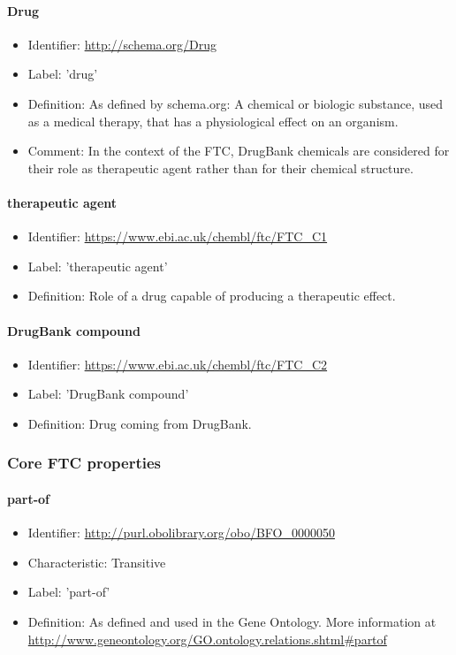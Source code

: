 \paragraph{Drug}
\begin{itemize}
  \item Identifier: \url{http://schema.org/Drug}
  \item Label: 'drug'
  \item Definition: As defined by schema.org: A chemical or biologic substance, used as a medical therapy, that has a physiological effect on an organism.
  \item Comment: In the context of the FTC, DrugBank chemicals are considered for their role as therapeutic agent rather than for their chemical structure.
\end{itemize}

\paragraph{therapeutic agent}
\begin{itemize}
  \item Identifier: \url{https://www.ebi.ac.uk/chembl/ftc/FTC\_C1}
  \item Label: 'therapeutic agent'
  \item Definition: Role of a drug capable of producing a therapeutic effect.
\end{itemize}

\paragraph{DrugBank compound}
\begin{itemize}
  \item Identifier: \url{https://www.ebi.ac.uk/chembl/ftc/FTC\_C2}
  \item Label: 'DrugBank compound'
  \item Definition: Drug coming from DrugBank.
\end{itemize}

\subsubsection{Core FTC properties}

\paragraph{part-of}
\begin{itemize}
  \item Identifier: \url{http://purl.obolibrary.org/obo/BFO\_0000050}
  \item Characteristic: Transitive
  \item Label: 'part-of'
  \item Definition: As defined and used in the Gene Ontology. More information at \url{http://www.geneontology.org/GO.ontology.relations.shtml\#partof}
\end{itemize}

